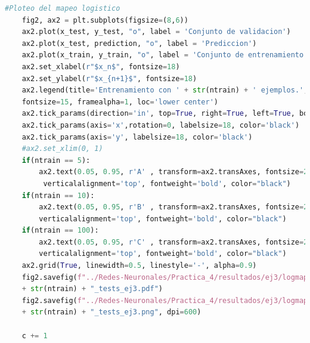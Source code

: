 \documentclass[11pt,twocolumn,twoside]{opticajnl}
\begin{document}
\begin{onecolumn}
\begin{lstlisting}[language=Python, caption={Ejercicio 3}, label=ej3]
    #Ploteo del mapeo logistico
    fig2, ax2 = plt.subplots(figsize=(8,6)) 
    ax2.plot(x_test, y_test, "o", label = 'Conjunto de validacion')
    ax2.plot(x_test, prediction, "o", label = 'Prediccion')
    ax2.plot(x_train, y_train, "o", label = 'Conjunto de entrenamiento')
    ax2.set_xlabel(r"$x_n$", fontsize=18)
    ax2.set_ylabel(r"$x_{n+1}$", fontsize=18)
    ax2.legend(title='Entrenamiento con ' + str(ntrain) + ' ejemplos.', 
    fontsize=15, framealpha=1, loc='lower center')
    ax2.tick_params(direction='in', top=True, right=True, left=True, bottom=True)
    ax2.tick_params(axis='x',rotation=0, labelsize=18, color='black')
    ax2.tick_params(axis='y', labelsize=18, color='black')
    #ax2.set_xlim(0, 1)
    if(ntrain == 5):
        ax2.text(0.05, 0.95, r'A' , transform=ax2.transAxes, fontsize=24,
         verticalalignment='top', fontweight='bold', color="black")
    if(ntrain == 10):
        ax2.text(0.05, 0.95, r'B' , transform=ax2.transAxes, fontsize=24, 
        verticalalignment='top', fontweight='bold', color="black")
    if(ntrain == 100):
        ax2.text(0.05, 0.95, r'C' , transform=ax2.transAxes, fontsize=24, 
        verticalalignment='top', fontweight='bold', color="black")
    ax2.grid(True, linewidth=0.5, linestyle='-', alpha=0.9)
    fig2.savefig(f"../Redes-Neuronales/Practica_4/resultados/ej3/logmap_" 
    + str(ntrain) + "_tests_ej3.pdf")
    fig2.savefig(f"../Redes-Neuronales/Practica_4/resultados/ej3/logmap_" 
    + str(ntrain) + "_tests_ej3.png", dpi=600)

    c += 1
\end{lstlisting}

\end{onecolumn}
\end{document}
